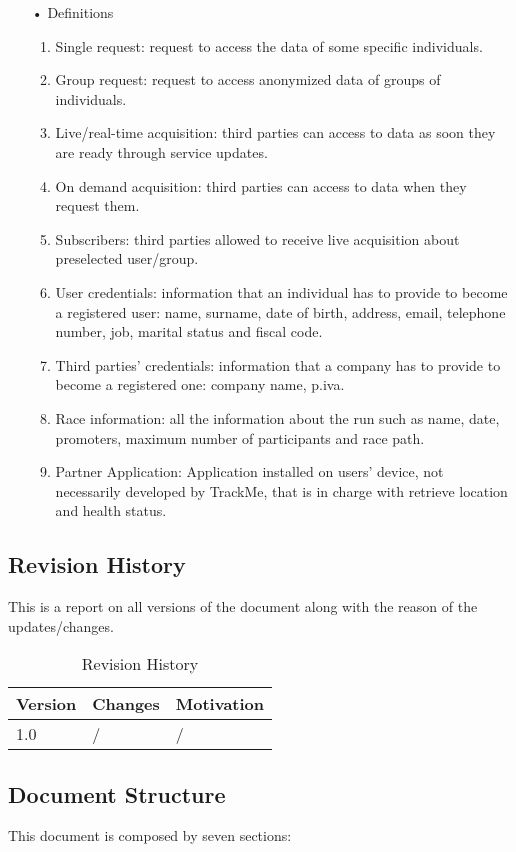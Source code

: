 \begin{enumerate}
\item[•] {\Large Definitions}
	\begin{enumerate}
		\item Single request: request to access the data of some specific  individuals.
		\item Group request: request to access anonymized data of groups of individuals.
		\item Live/real-time acquisition: third parties can access to data as soon they are ready through service updates.
		\item On demand acquisition: third parties can access to data when they request them.
		\item Subscribers: third parties allowed to receive live acquisition about preselected user/group.
		\item User credentials: information that an individual has to provide to become a registered user: name, surname, date of birth, address, email, telephone number, job, marital status and fiscal code. 
		\item Third parties' credentials: information that a company has to provide to become a registered one: company name, p.iva.
		\item Race information: all the information about the run such as name, date, promoters, maximum number of participants and race path.
		\item Partner Application: Application installed on users' device, not necessarily developed by TrackMe, that is in charge with retrieve location and health status. 
	\end{enumerate}
\end{enumerate}
\subsection{Revision History}
This is a report on all versions of the document along with the reason of the updates/changes.

\begin{table}[h]
\centering
\begin{tabular}{|l|p{}|p{}|}
\hline
Version & Changes & Motivation\\ \hline
1.0     & / & / \\ \hline
\end{tabular}
\caption{Revision History}
\end{table}

\clearpage
\subsection{Document Structure}
This document is composed by seven sections:

